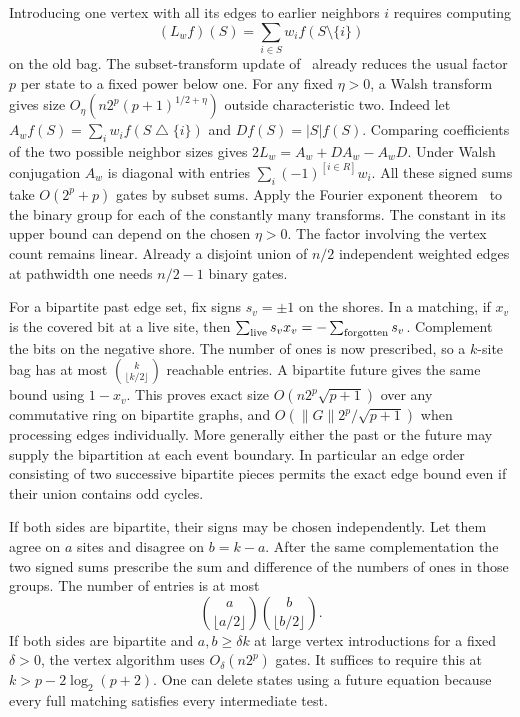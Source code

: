 \documentclass[11pt]{article}
\theoremstyle{definition}
\begin{document}
Introducing one vertex with all its edges to earlier neighbors \(i\) requires computing
\[
             (L_w f)(S)=\sum_{i\in S}w_i f(S\setminus\{i\})
\]
on the old bag. The subset-transform update of~\cite{falco-network} already reduces the usual factor \(p\) per state to a fixed power below one. For any fixed \(\eta>0\), a Walsh transform gives size \(O_\eta(n2^p(p+1)^{1/2+\eta})\) outside characteristic two. Indeed let \(A_w f(S)=\sum_iw_i f(S\mathbin{\triangle}\{i\})\) and \(Df(S)=|S|f(S)\). Comparing coefficients of the two possible neighbor sizes gives \(2L_w=A_w+DA_w-A_wD\). Under Walsh conjugation \(A_w\) is diagonal with entries \(\sum_i(-1)^{[i\in R]}w_i\). All these signed sums take \(O(2^p+p)\) gates by subset sums. Apply the Fourier exponent theorem~\cite{fourier-exponent} to the binary group for each of the constantly many transforms. The constant in its upper bound can depend on the chosen \(\eta>0\). The factor involving the vertex count remains linear. Already a disjoint union of \(n/2\) independent weighted edges at pathwidth one needs \(n/2-1\) binary gates.

For a bipartite past edge set, fix signs \(s_v=\pm1\) on the shores. In a matching, if \(x_v\) is the covered bit at a live site, then \(\sum_{\rm live}s_vx_v=-\sum_{\rm forgotten}s_v\). Complement the bits on the negative shore. The number of ones is now prescribed, so a \(k\)-site bag has at most \(\binom{k}{\lfloor k/2\rfloor}\) reachable entries. A bipartite future gives the same bound using \(1-x_v\). This proves exact size \(O(n2^p\sqrt{p+1})\) over any commutative ring on bipartite graphs, and \(O(\|G\|2^p/\sqrt{p+1})\) when processing edges individually. More generally either the past or the future may supply the bipartition at each event boundary. In particular an edge order consisting of two successive bipartite pieces permits the exact edge bound even if their union contains odd cycles.

If both sides are bipartite, their signs may be chosen independently. Let them agree on \(a\) sites and disagree on \(b=k-a\). After the same complementation the two signed sums prescribe the sum and difference of the numbers of ones in those groups. The number of entries is at most
\[
          \binom a{\lfloor a/2\rfloor}\binom b{\lfloor b/2\rfloor}.
\]
If both sides are bipartite and \(a,b\ge\delta k\) at large vertex introductions for a fixed \(\delta>0\), the vertex algorithm uses \(O_\delta(n2^p)\) gates. It suffices to require this at \(k>p-2\log_2(p+2)\). One can delete states using a future equation because every full matching satisfies every intermediate test.
\end{document}
